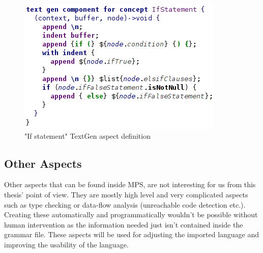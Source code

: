 \begin{figure}[ht]
	\centering
	\includegraphics[scale=0.70]{./img/if_statement_textgen.png}
	\caption{"If statement" TextGen aspect definition}
	\label{fig:if_statement_textgen}
\end{figure}

\subsection{Other Aspects}
Other aspects that can be found inside MPS, are not interesting for us from this thesis' point of view.
They are mostly high level and very complicated aspects such as type checking or data-flow analysis (unreachable code detection etc.).
Creating these automatically and programmatically wouldn't be possible without human intervention as the information needed just isn't contained inside the grammar file.
These aspects will be used for adjusting the imported language and improving the usability of the language.